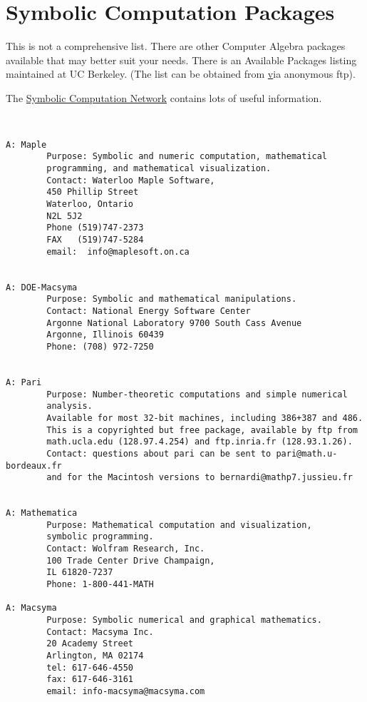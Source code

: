 \section{Symbolic Computation Packages}

    This is not a comprehensive list. There are other Computer Algebra
    packages available that may better suit your needs. There is an
    Available Packages listing maintained at UC Berkeley.  (The list
    can be obtained from \href{ftp://math.berkeley.edu/} via anonymous ftp).

    The  \href{http://symbolicnet.mcs.kent.edu/}{Symbolic Computation
      Network} contains lots of useful information.

\begin{verbatim}


A: Maple
        Purpose: Symbolic and numeric computation, mathematical
        programming, and mathematical visualization.
        Contact: Waterloo Maple Software,
        450 Phillip Street
        Waterloo, Ontario
        N2L 5J2
        Phone (519)747-2373
        FAX   (519)747-5284
        email:  info@maplesoft.on.ca


A: DOE-Macsyma
        Purpose: Symbolic and mathematical manipulations.
        Contact: National Energy Software Center
        Argonne National Laboratory 9700 South Cass Avenue
        Argonne, Illinois 60439
        Phone: (708) 972-7250


A: Pari
        Purpose: Number-theoretic computations and simple numerical
        analysis.
        Available for most 32-bit machines, including 386+387 and 486.
        This is a copyrighted but free package, available by ftp from
        math.ucla.edu (128.97.4.254) and ftp.inria.fr (128.93.1.26).
        Contact: questions about pari can be sent to pari@math.u-bordeaux.fr
        and for the Macintosh versions to bernardi@mathp7.jussieu.fr


A: Mathematica
        Purpose: Mathematical computation and visualization,
        symbolic programming.
        Contact: Wolfram Research, Inc.
        100 Trade Center Drive Champaign,
        IL 61820-7237
        Phone: 1-800-441-MATH

A: Macsyma
        Purpose: Symbolic numerical and graphical mathematics.
        Contact: Macsyma Inc.
        20 Academy Street
        Arlington, MA 02174
        tel: 617-646-4550
        fax: 617-646-3161
        email: info-macsyma@macsyma.com



\end{verbatim}
